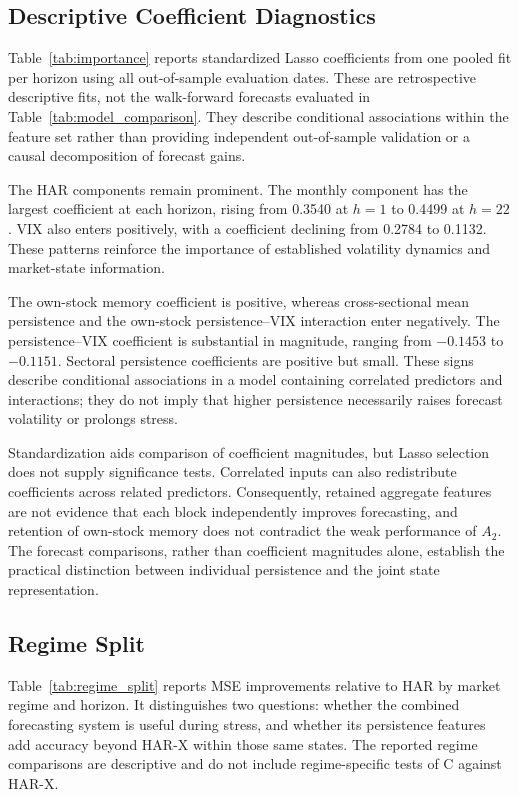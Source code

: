 \documentclass[jrfm,article,submit,moreauthors,pdftex]{Definitions/mdpi}
\begin{document}
\subsection{Descriptive Coefficient Diagnostics}

Table~\ref{tab:importance} reports standardized Lasso coefficients from one
pooled fit per horizon using all out-of-sample evaluation dates. These are
retrospective descriptive fits, not the walk-forward forecasts evaluated
in Table~\ref{tab:model_comparison}. They describe conditional associations
within the feature set rather than providing independent out-of-sample
validation or a causal decomposition of forecast gains.



The HAR components remain prominent. The monthly component has the largest
coefficient at each horizon, rising from 0.3540 at $h=1$ to 0.4499 at
$h=22$. VIX also enters positively, with a coefficient declining from
0.2784 to 0.1132. These patterns reinforce the importance of established
volatility dynamics and market-state information.

The own-stock memory coefficient is positive, whereas cross-sectional mean
persistence and the own-stock persistence--VIX interaction enter negatively. The
persistence--VIX coefficient is substantial in magnitude, ranging from
$-0.1453$ to $-0.1151$. Sectoral persistence coefficients are positive but
small. These signs describe conditional associations in a model containing
correlated predictors and interactions; they do not imply that higher
persistence necessarily raises forecast volatility or prolongs stress.

Standardization aids comparison of coefficient magnitudes, but Lasso
selection does not supply significance tests. Correlated inputs can also
redistribute coefficients across related predictors. Consequently, retained
aggregate features are not evidence that each block independently improves
forecasting, and retention of own-stock memory does not contradict the weak
performance of $A_2$. The forecast comparisons, rather than coefficient
magnitudes alone, establish the practical distinction between individual
persistence and the joint state representation.

\subsection{Regime Split}

Table~\ref{tab:regime_split} reports MSE improvements relative to HAR by
market regime and horizon. It distinguishes two questions: whether the
combined forecasting system is useful during stress, and whether its
persistence features add accuracy beyond HAR-X within those same states.
The reported regime comparisons are descriptive and do not include
regime-specific tests of C against HAR-X.
\end{document}
